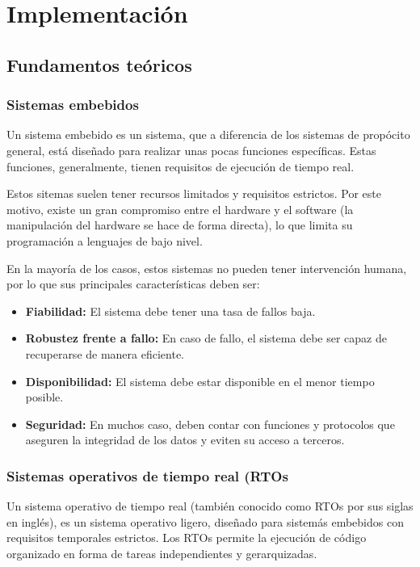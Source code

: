 	\section{Implementación}
	
	\subsection{Fundamentos teóricos}
		\subsubsection{Sistemas embebidos}
		
		Un sistema embebido es un sistema, que a diferencia de los sistemas de propócito general, está diseñado para realizar unas pocas funciones específicas. Estas funciones, generalmente, tienen requisitos de ejecución de tiempo real.
		
		Estos sitemas suelen tener recursos limitados y requisitos  estrictos. Por este motivo, existe un gran compromiso entre el hardware y el software (la manipulación del hardware se hace de forma directa), lo que limita su programación a lenguajes de bajo nivel.
		
		En la mayoría de los casos, estos sistemas no pueden tener intervención humana, por lo que sus principales características deben ser:
		
		\begin{itemize}
			\item \textbf{Fiabilidad: }El sistema debe tener una tasa de fallos baja.
			\item \textbf{Robustez frente a fallo: }En caso de fallo, el sistema debe ser capaz de recuperarse de manera eficiente.
			
			\item \textbf{Disponibilidad: }El sistema debe estar disponible en el menor tiempo posible.
			
			\item \textbf{Seguridad: }En muchos caso, deben contar con funciones y protocolos que aseguren la integridad de los datos y eviten su acceso a terceros.
		\end{itemize}
		
		
		
		\subsubsection{Sistemas operativos de tiempo real (RTOs}
		Un sistema operativo de tiempo real (también conocido como RTOs por sus siglas en inglés), es un sistema operativo ligero, diseñado para sistemás embebidos con requisitos temporales estrictos. Los RTOs permite la ejecución de código organizado en forma de tareas independientes y gerarquizadas.
		
